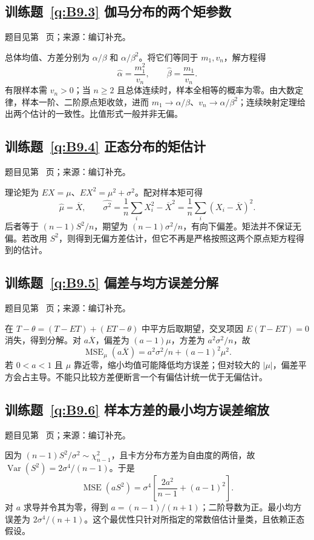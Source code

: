 \subsection*{训练题~\ref{q:B9.3} 伽马分布的两个矩参数}\label{a:B9.3}{\small 题目见第~\pageref{q:B9.3} 页；来源：编订补充。}
\begin{solve}总体均值、方差分别为 $\alpha/\beta$ 和 $\alpha/\beta^2$。将它们等同于 $m_1,v_n$，解方程得\[\widehat\alpha=\frac{m_1^2}{v_n},\qquad\widehat\beta=\frac{m_1}{v_n}.\]有限样本需 $v_n>0$；当 $n\ge2$ 且总体连续时，样本全相等的概率为零。由大数定律，样本一阶、二阶原点矩收敛，进而 $m_1\to\alpha/\beta$、$v_n\to\alpha/\beta^2$；连续映射定理给出两个估计的一致性。比值形式一般并非无偏。\end{solve}

\subsection*{训练题~\ref{q:B9.4} 正态分布的矩估计}\label{a:B9.4}{\small 题目见第~\pageref{q:B9.4} 页；来源：编订补充。}
\begin{solve}理论矩为 $EX=\mu$、$EX^2=\mu^2+\sigma^2$。配对样本矩可得\[\widehat\mu=\overline X,\qquad\widehat{\sigma^2}=\frac1n\sum_iX_i^2-\overline X^2=\frac1n\sum_i(X_i-\overline X)^2.\]后者等于 $(n-1)S^2/n$，期望为 $(n-1)\sigma^2/n$，有向下偏差。矩法并不保证无偏。若改用 $S^2$，则得到无偏方差估计，但它不再是严格按照这两个原点矩方程得到的估计。\end{solve}

\subsection*{训练题~\ref{q:B9.5} 偏差与均方误差分解}\label{a:B9.5}{\small 题目见第~\pageref{q:B9.5} 页；来源：编订补充。}
\begin{solve}在 $T-\theta=(T-ET)+(ET-\theta)$ 中平方后取期望，交叉项因 $E(T-ET)=0$ 消失，得到分解。对 $a\overline X$，偏差为 $(a-1)\mu$，方差为 $a^2\sigma^2/n$，故\[\operatorname{MSE}_\mu(a\overline X)=a^2\sigma^2/n+(a-1)^2\mu^2.\]若 $0<a<1$ 且 $\mu$ 靠近零，缩小均值可能降低均方误差；但对较大的 $|\mu|$，偏差平方会占主导。不能只比较方差便断言一个有偏估计统一优于无偏估计。\end{solve}

\subsection*{训练题~\ref{q:B9.6} 样本方差的最小均方误差缩放}\label{a:B9.6}{\small 题目见第~\pageref{q:B9.6} 页；来源：编订补充。}
\begin{solve}因为 $(n-1)S^2/\sigma^2\sim\chi^2_{n-1}$，且卡方分布方差为自由度的两倍，故 $\operatorname{Var}(S^2)=2\sigma^4/(n-1)$。于是\[\operatorname{MSE}(aS^2)=\sigma^4\left[\frac{2a^2}{n-1}+(a-1)^2\right].\]对 $a$ 求导并令其为零，得到 $a=(n-1)/(n+1)$；二阶导数为正。最小均方误差为 $2\sigma^4/(n+1)$。这个最优性只针对所指定的常数倍估计量类，且依赖正态假设。\end{solve}

